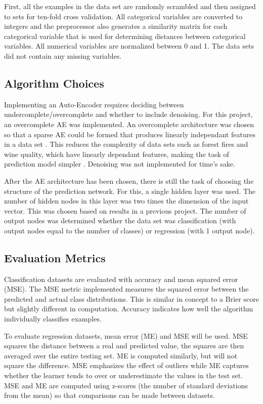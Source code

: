 \documentclass[twoside,11pt]{article}
\begin{document}
	First, all the examples in the data set are randomly scrambled and then assigned to sets for ten-fold cross validation. 
	All categorical variables are converted to integers 
	and the preprocessor also generates a similarity matrix for each categorical variable that is used for determining distances between categorical variables. 
	All numerical variables are normalized between 0 and 1. 
	The data sets did not contain any missing variables.

\subsection{Algorithm Choices}
	
	Implementing an Auto-Encoder requires deciding between undercomplete/overcomplete and whether to include denoising.
	For this project, an overcomplete AE was implemented. An overcomplete architecture was chosen so that a sparse AE could be formed that produces linearly independant features in a data set \citep{sparsity}. 
	This reduces the complexity of data sets such as forest fires and wine quality, which have linearly dependant features, making the task of prediction model simpler \citep{datasets}.
	Denoising was not implemented for time's sake.
	
	After the AE architecture has been chosen, there is still the task of choosing the structure of the prediction network.
	For this, a single hidden layer was used. 
	The number of hidden nodes in this layer was two times the dimension of the input vector. This was chosen based on results in a previous project. 
	The number of output nodes was determined whether the data set was classification (with output nodes equal to the number of classes) or regression (with 1 output node).

\subsection{Evaluation Metrics}

	Classification datasets are evaluated with accuracy and mean squared error (MSE). 
	The MSE metric implemented measures the squared error between the predicted and actual class distributions. 
	This is similar in concept to a Brier score but slightly different in computation. Accuracy indicates how well the algorithm individually classifies examples.
	
	To evaluate regression datasets, mean error (ME) and MSE will be used. MSE squares the distance between a real and predicted value, the squares are then averaged over the entire testing set. 
	ME is computed similarly, but will not square the difference. MSE emphasizes the effect of outliers while ME captures whether the learner tends to over or underestimate the values in the test set. 
	MSE and ME are computed using z-scores (the number of standard deviations from the mean) so that comparisons can be made between datasets.
\end{document}
